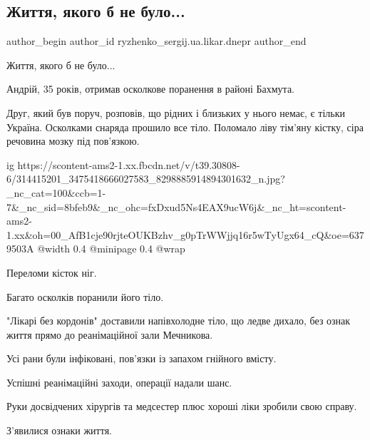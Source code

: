  
 
 
 
 
 
\subsection{Життя, якого б не було...}
\label{sec:12_11_2022.fb.ryzhenko_sergij.ua.likar.dnepr.1.zhyttja_jakogo_b_ne_bulo}
 
\ifcmt
 author_begin
   author_id ryzhenko_sergij.ua.likar.dnepr
 author_end
\fi

Життя, якого б не було...

Андрій, 35 років, отримав осколкове поранення в районі Бахмута.  

Друг, який був поруч, розповів, що рідних і близьких у нього немає, є тільки
Україна.  Осколками снаряда прошило все тіло.  Поломало ліву тім'яну кістку,
сіра речовина мозку під пов'язкою.

\ifcmt
  ig https://scontent-ams2-1.xx.fbcdn.net/v/t39.30808-6/314415201_3475418666027583_8298885914894301632_n.jpg?_nc_cat=100&ccb=1-7&_nc_sid=8bfeb9&_nc_ohc=fxDxud5Ns4EAX9ucW6j&_nc_ht=scontent-ams2-1.xx&oh=00_AfB1cje90rjteOUKBzhv_g0pTrWWjjq16r5wTyUgx64_cQ&oe=6379503A
  @width 0.4
  @minipage 0.4
  @wrap \parpic[r]
\fi

Переломи кісток ніг. 

Багато осколків поранили його тіло.

"Лікарі без кордонів" доставили напівхолодне тіло, що ледве дихало, без ознак
життя прямо до реанімаційної зали Мечникова.  

Усі рани були інфіковані, пов'язки із запахом гнійного вмісту.  

Успішні реанімаційні заходи, операції надали шанс.  

Руки досвідчених хірургів та медсестер плюс хороші ліки зробили свою справу.  

З'явилися ознаки життя.  

